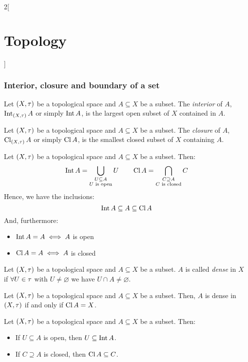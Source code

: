 \documentclass[../../../main.tex]{subfiles}
\begin{document}
\begin{multicols}{2}[\section{Topology}]
    \subsubsection{Interior, closure and boundary of a set}
    \begin{definition}[Interior]
        Let $(X,\tau)$ be a topological space and $A\subseteq X$ be a subset. The \emph{interior} of $A$, $\operatorname{Int}_{(X,\tau)} A$ or simply $\operatorname{Int} A$, is the largest open subset of $X$ contained in $A$.
    \end{definition}
    \begin{definition}[Closure]
        Let $(X,\tau)$ be a topological space and $A\subseteq X$ be a subset. The \emph{closure} of $A$, $\operatorname{Cl}_{(X,\tau)} A$ or simply $\operatorname{Cl} A$, is the smallest closed subset of $X$ containing $A$.
    \end{definition}
    \begin{prop}
        Let $(X,\tau)$ be a topological space and $A\subseteq X$ be a subset. Then: $$\operatorname{Int} A=\bigcup_{\substack{U\subseteq A\\U\text{ is open}}}U\qquad\operatorname{Cl} A=\bigcap_{\substack{C\supseteq A\\C\text{ is closed}}}C$$
        Hence, we have the inclusions: $$\operatorname{Int} A\subseteq A\subseteq \operatorname{Cl} A$$
        And, furthermore:
        \begin{itemize}
            \item $\operatorname{Int} A=A\iff A$ is open
            \item $\operatorname{Cl} A=A\iff A$ is closed
        \end{itemize}
    \end{prop}
    \begin{definition}
        Let $(X,\tau)$ be a topological space and $A\subseteq X$ be a subset. $A$ is called \emph{dense} in $X$ if $\forall U\in\tau$ with $U\ne\varnothing$ we have $U\cap A\ne\varnothing$.
    \end{definition}
    \begin{prop}
        Let $(X,\tau)$ be a topological space and $A\subseteq X$ be a subset. Then, $A$ is dense in $(X,\tau)$ if and only if $\operatorname{Cl} A=X$.
    \end{prop}
    \begin{prop}
        Let $(X,\tau)$ be a topological space and $A\subseteq X$ be a subset. Then:
        \begin{itemize}
            \item If $U\subseteq A$ is open, then $U\subseteq\operatorname{Int} A$.
            \item If $C\supseteq A$ is closed, then $\operatorname{Cl} A\subseteq C$.

\end{itemize}
\end{prop}
\end{multicols}
\end{document}
